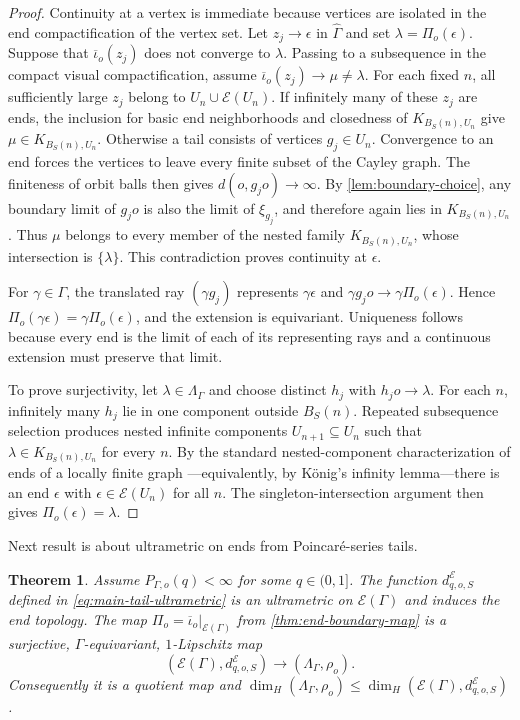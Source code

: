 \documentclass[11pt]{article}
\newtheorem{theorem}{Theorem}[section]
\theoremstyle{definition}
\begin{document}
\begin{proof}
Continuity at a vertex is immediate because vertices are isolated in the end compactification of the vertex set.  Let $z_j\to\epsilon$ in $\widehat\Gamma$ and set
$\lambda=\Pi_o(\epsilon)$.  Suppose that
$\overline\iota_o(z_j)$ does not converge to $\lambda$.  Passing to a subsequence in the
compact visual compactification, assume
$\overline\iota_o(z_j)\to\mu\ne\lambda$.  For each fixed $n$, all sufficiently large $z_j$
belong to $U_n\cup\mathcal E(U_n)$.  If infinitely many of these $z_j$ are ends, the inclusion for basic end neighborhoods and closedness of $K_{B_S(n),U_n}$ give
$\mu\in K_{B_S(n),U_n}$.  Otherwise a tail consists of vertices $g_j\in U_n$.  Convergence to
an end forces the vertices to leave every finite subset of the Cayley graph. The finiteness of
orbit balls then gives $d(o,g_jo)\to\infty$.  By \cref{lem:boundary-choice}, any boundary limit of
$g_jo$ is also the limit of $\xi_{g_j}$, and therefore again lies in
$K_{B_S(n),U_n}$.  Thus $\mu$ belongs to every member of the nested family
$K_{B_S(n),U_n}$, whose intersection is $\{\lambda\}$.  This contradiction proves continuity
at $\epsilon$.

For $\gamma\in\Gamma$, the translated ray $(\gamma g_j)$ represents $\gamma\epsilon$ and
$\gamma g_jo\to\gamma\Pi_o(\epsilon)$.  Hence
$\Pi_o(\gamma\epsilon)=\gamma\Pi_o(\epsilon)$, and the extension is equivariant.  Uniqueness
follows because every end is the limit of each of its representing rays and a continuous
extension must preserve that limit.

To prove surjectivity, let $\lambda\in\Lambda_\Gamma$ and choose distinct $h_j$ with
$h_jo\to\lambda$.  For each $n$, infinitely many $h_j$ lie in one component outside
$B_S(n)$.  Repeated subsequence selection produces nested infinite components
$U_{n+1}\subseteq U_n$ such that
$\lambda\in K_{B_S(n),U_n}$ for every $n$.  By the standard nested-component
characterization of ends of a locally finite graph
\cite[Section~8.5]{Diestel2010}---equivalently, by K\"onig's infinity lemma---there is an end
$\epsilon$ with $\epsilon\in\mathcal E(U_n)$ for all $n$.  The singleton-intersection argument
then gives $\Pi_o(\epsilon)=\lambda$.
\end{proof}

Next result is about ultrametric on ends from Poincar\'e-series tails.

\begin{theorem}
\label{thm:end-ultrametric}
Assume $P_{\Gamma,o}(q)<\infty$ for some $q\in(0,1]$.  The function
$d^{\mathcal E}_{q,o,S}$ defined in \eqref{eq:main-tail-ultrametric} is an ultrametric on
$\mathcal E(\Gamma)$ and induces the end topology.  The map
$\Pi_o=\overline\iota_o|_{\mathcal E(\Gamma)}$ from
\cref{thm:end-boundary-map} is a surjective, $\Gamma$-equivariant, $1$-Lipschitz map
\[
 (\mathcal E(\Gamma),d^{\mathcal E}_{q,o,S})
 \longrightarrow(\Lambda_\Gamma,\rho_o).
\]
Consequently it is a quotient map and
$\dim_H(\Lambda_\Gamma,\rho_o)\le
\dim_H(\mathcal E(\Gamma),d^{\mathcal E}_{q,o,S})$.
\end{theorem}
\end{document}
